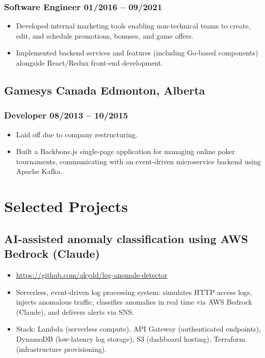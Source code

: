 \documentclass[10pt]{article}
\begin{document}
\subsubsection{Software Engineer \hfill 01/2016 -- 09/2021}
\begin{itemize}
  \item Developed internal marketing tools enabling non-technical teams to create, edit, and schedule promotions, bonuses, and game offers.
  \item Implemented backend services and features (including Go-based components) alongside React/Redux front-end development.
\end{itemize}

\subsection{Gamesys Canada \hfill Edmonton, Alberta}
\subsubsection{Developer \hfill 08/2013 -- 10/2015}
\begin{itemize}
  \item Laid off due to company restructuring.
  \item Built a Backbone.js single-page application for managing online poker tournaments, communicating with an event-driven microservice backend using Apache Kafka.
\end{itemize}

\section{Selected Projects}

\subsection{AI-assisted anomaly classification using AWS Bedrock (Claude)}
\begin{itemize}
    \item \url{https://github.com/akydd/log-anomale-detector}
  \item Serverless, event-driven log processing system: simulates HTTP access logs, injects anomalous traffic, classifies anomalies in real time via AWS Bedrock (Claude), and delivers alerts via SNS.
  \item Stack: Lambda (serverless compute), API Gateway (authenticated endpoints), DynamoDB (low-latency log storage), S3 (dashboard hosting), Terraform (infrastructure provisioning).
\end{itemize}
\end{document}
